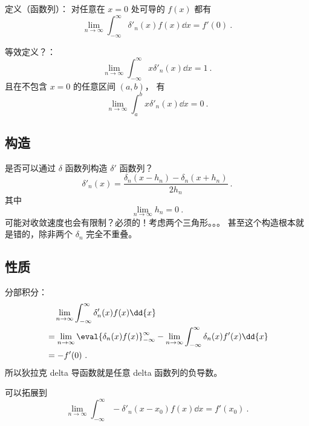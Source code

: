 
\begin{issues}
\issueDraft
\end{issues}


定义（函数列）： 对任意在 $x=0$ 处可导的 $f(x)$ 都有
\begin{equation}
\lim_{n\to\infty}\int_{-\infty}^\infty \delta'_n(x) f(x) \dd{x} = f'(0)~.
\end{equation}

等效定义？：
\begin{equation}
\lim_{n\to\infty}\int_{-\infty}^\infty x\delta'_n(x) \dd{x} = 1~.
\end{equation}
且在不包含 $x=0$ 的任意区间 $(a,b)$， 有
\begin{equation}
\lim_{n\to\infty}\int_a^b x\delta'_n(x) \dd{x} = 0~.
\end{equation}


\subsection{构造}
是否可以通过 $\delta$ 函数列构造 $\delta'$ 函数列？
\begin{equation}
\delta'_n(x) = \frac{\delta_n(x-h_n) - \delta_n(x+h_n)}{2h_n}~.
\end{equation}
其中
\begin{equation}
\lim_{n\to\infty} h_n = 0~.
\end{equation}
可能对收敛速度也会有限制？必须的！考虑两个三角形。。。 甚至这个构造根本就是错的，除非两个 $\delta_n$ 完全不重叠。

\subsection{性质}
分部积分：
\begin{equation}
\begin{aligned}
&\quad \lim_{n\to\infty}\int_{-\infty}^\infty \delta'_n(x) f(x) \dd{x}\\
&= \lim_{n\to\infty}\eval{\delta_n(x) f(x)}_{-\infty}^\infty - \lim_{n\to\infty}\int_{-\infty}^\infty \delta_n(x) f'(x) \dd{x}\\
&= - f'(0)~.
\end{aligned}
\end{equation}
所以狄拉克 delta 导函数就是任意 delta 函数列的负导数。

可以拓展到
\begin{equation}
\lim_{n\to\infty}\int_{-\infty}^\infty -\delta'_n(x-x_0) f(x) \dd{x} = f'(x_0)~.
\end{equation}

